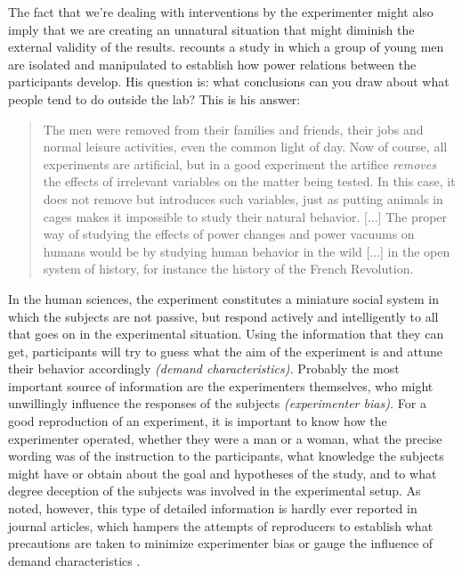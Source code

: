 \documentclass[twocolumn, serif, authordate, reflection]{jote-article}
\begin{document}
 The fact that we're dealing with interventions by the experimenter might also imply that we are creating an unnatural situation that might diminish the external validity of the results. \textcite{Collier2005} recounts a study in which a group of young men are isolated and manipulated to establish how power relations between the participants develop. His question is: what conclusions can you draw about what people tend to do outside the lab? This is his answer: 

\begin{quote}
The men were removed from their families and friends, their jobs and normal leisure activities, even the common light of day. Now of course, all experiments are artificial, but in a good experiment the artifice \textit{removes }the effects of irrelevant variables on the matter being tested. In this case, it does not remove but introduces such variables, just as putting animals in cages makes it impossible to study their natural behavior. [...] The proper way of studying the effects of power changes and power vacuums on humans would be by studying human behavior in the wild [...] in the open system of history, for instance the history of the French Revolution. \parencite[p. 332]{Collier2005}

\end{quote}

In the human sciences, the experiment constitutes a miniature social system in which the subjects are not passive, but respond actively and intelligently to all that goes on in the experimental situation. Using the information that they can get, participants will try to guess what the aim of the experiment is and attune their behavior accordingly \textit{(demand characteristics). }Probably the most important source of information are the experimenters themselves, who might unwillingly influence the responses of the subjects \textit{(experimenter bias). }For a good reproduction of an experiment, it is important to know how the experimenter operated, whether they were a man or a woman, what the precise wording was of the instruction to the participants, what knowledge the subjects might have or obtain about the goal and hypotheses of the study, and to what degree deception of the subjects was involved in the experimental setup. As noted, however, this type of detailed information is hardly ever reported in journal articles, which hampers the attempts of reproducers to establish what precautions are taken to minimize experimenter bias or gauge the influence of demand characteristics \parencite{Klein2012}.
\end{document}
